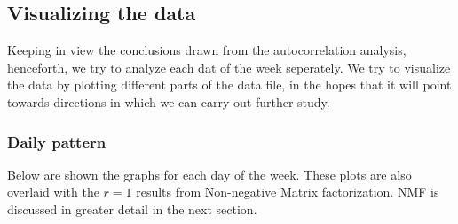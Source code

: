 \documentclass[10pt,a4paper]{amsart}
\begin{document}
\newpage
\subsection{Visualizing the data}
Keeping in view the conclusions drawn from the autocorrelation analysis,
henceforth, we try to analyze each dat of the week seperately. We try to
visualize the data by plotting different parts of the data file, in the hopes
that it will point towards directions in which we can carry out further study. 

\subsubsection{Daily pattern}
Below are shown the graphs for each day of the week. These plots are also
overlaid with the \(r=1\) results from Non-negative Matrix factorization. NMF
is discussed in greater detail in the next section.
\end{document}
